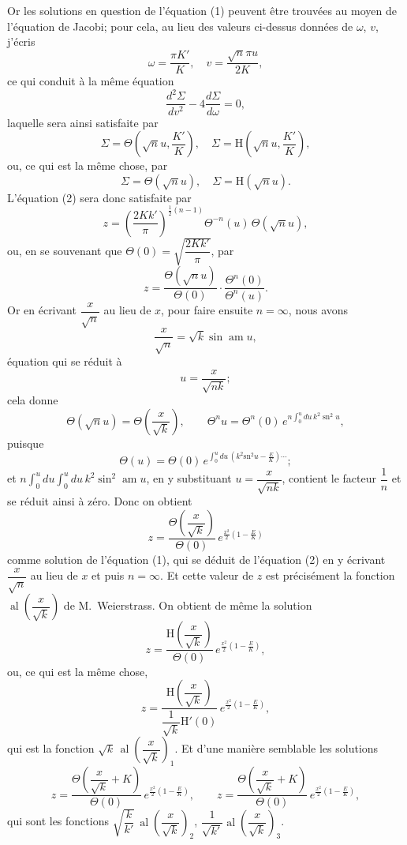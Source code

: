 \documentclass[11pt,a4paper]{article}
\providecommand{\al}{\mathop{\mathrm{al}}\nolimits}
\providecommand{\sn}{\mathop{\mathrm{sn}}\nolimits}
\providecommand{\am}{\mathop{\mathrm{am}}\nolimits}
\begin{document}
Or les solutions en question de l'\'{e}quation (1) peuvent \^{e}tre trouv\'{e}es au moyen de l'\'{e}quation de Jacobi; pour cela, au lieu des valeurs ci-dessus donn\'{e}es de $\omega$, $v$, j'\'{e}cris
\[
\omega=\frac{\pi K'}{K},\quad v=\frac{\sqrt{n}\pi u}{2K},
\]
ce qui conduit \`{a} la m\^{e}me \'{e}quation
\[
\frac{d^2\Sigma}{dv^2}-4\frac{d\Sigma}{d\omega}=0,
\]
laquelle sera ainsi satisfaite par
\[
\Sigma=\Theta\!\left(\sqrt{n}u,\frac{K'}{K}\right),\quad \Sigma=\mathrm{H}\!\left(\sqrt{n}u,\frac{K'}{K}\right),
\]
ou, ce qui est la m\^{e}me chose, par
\[
\Sigma=\Theta(\sqrt{n}u),\quad \Sigma=\mathrm{H}(\sqrt{n}u).
\]
L'\'{e}quation (2) sera donc satisfaite par
\[
z=\left(\frac{2Kk'}{\pi}\right)^{\!\!\tfrac{1}{2}(n-1)}\!\!\Theta^{-n}(u)\,\Theta(\sqrt{n}u),
\]
ou, en se souvenant que $\Theta(0)=\sqrt{\dfrac{2Kk'}{\pi}}$, par
\[
z=\frac{\Theta(\sqrt{n}u)}{\Theta(0)}\cdot\frac{\Theta^n(0)}{\Theta^n(u)}.
\]
Or en \'{e}crivant $\dfrac{x}{\sqrt{n}}$ au lieu de $x$, pour faire ensuite $n=\infty$, nous avons
\[
\frac{x}{\sqrt{n}}=\sqrt{k}\sin\am u,
\]
\'{e}quation qui se r\'{e}duit \`{a}
\[
u=\frac{x}{\sqrt{nk}};
\]
cela donne
\[
\Theta(\sqrt{n}u)=\Theta\!\left(\frac{x}{\sqrt{k}}\right),\qquad \Theta^n u=\Theta^n(0)\,e^{n\int_0^u du\,k^2\sn^2 u},
\]
puisque
\[
\Theta(u)=\Theta(0)\,e^{\int_0^u du\,(k^2 \mathrm{sn}^2 u - \tfrac{E}{K})\cdots};
\]
et $n\displaystyle\int_0^u du\int_0^u du\,k^2\sin^2\am u$, en y substituant $u=\dfrac{x}{\sqrt{nk}}$, contient le facteur $\dfrac{1}{n}$ et se r\'{e}duit ainsi \`{a} z\'{e}ro. Donc on obtient
\[
z=\frac{\Theta\!\left(\dfrac{x}{\sqrt{k}}\right)}{\Theta(0)}\,e^{\tfrac{x^2}{2}\left(1-\tfrac{E}{K}\right)}
\]
comme solution de l'\'{e}quation (1), qui se d\'{e}duit de l'\'{e}quation (2) en y \'{e}crivant $\dfrac{x}{\sqrt{n}}$ au lieu de $x$ et puis $n=\infty$. Et cette valeur de $z$ est pr\'{e}cis\'{e}ment la fonction $\al\!\left(\dfrac{x}{\sqrt{k}}\right)$ de M.~Weierstrass. On obtient de m\^{e}me la solution
\[
z=\frac{\mathrm{H}\!\left(\dfrac{x}{\sqrt{k}}\right)}{\Theta(0)}\,e^{\tfrac{x^2}{2}\left(1-\tfrac{E}{K}\right)},
\]
ou, ce qui est la m\^{e}me chose,
\[
z=\frac{\mathrm{H}\!\left(\dfrac{x}{\sqrt{k}}\right)}{\dfrac{1}{\sqrt{k}}\mathrm{H}'(0)}\,e^{\tfrac{x^2}{2}\left(1-\tfrac{E}{K}\right)},
\]
qui est la fonction $\sqrt{k}\,\al\!\left(\dfrac{x}{\sqrt{k}}\right)_1$. Et d'une mani\`{e}re semblable les solutions
\[
z=\frac{\Theta\!\left(\dfrac{x}{\sqrt{k}}+K\right)}{\Theta(0)}\,e^{\tfrac{x^2}{2}\left(1-\tfrac{E}{K}\right)},\qquad z=\frac{\Theta\!\left(\dfrac{x}{\sqrt{k}}+K\right)}{\Theta(0)}\,e^{\tfrac{x^2}{2}\left(1-\tfrac{E}{K}\right)},
\]
qui sont les fonctions $\sqrt{\dfrac{k}{k'}}\,\al\!\left(\dfrac{x}{\sqrt{k}}\right)_2$, $\dfrac{1}{\sqrt{k'}}\al\!\left(\dfrac{x}{\sqrt{k}}\right)_3$.
\end{document}
